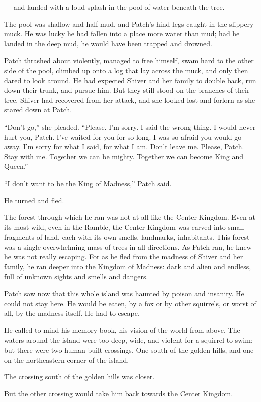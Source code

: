 \documentclass[ebook,oneside,openany,12pt]{memoir}
\begin{document}
— and landed with a loud splash in the pool of water beneath the tree.

The pool was shallow and half-mud, and Patch’s hind legs caught in the
slippery muck. He was lucky he had fallen into a place more water than
mud; had he landed in the deep mud, he would have been trapped and
drowned.

Patch thrashed about violently, managed to free himself, swam hard to
the other side of the pool, climbed up onto a log that lay across the
muck, and only then dared to look around. He had expected Shiver and
her family to double back, run down their trunk, and pursue him. But
they still stood on the branches of their tree. Shiver had recovered
from her attack, and she looked lost and forlorn as she stared down at
Patch.

“Don’t go,” she pleaded. “Please. I’m sorry. I said the wrong thing. I
would never hurt you, Patch. I’ve waited for you for so long. I was so
afraid you would go away. I’m sorry for what I said, for what I
am. Don’t leave me. Please, Patch. Stay with me. Together we can be
mighty. Together we can become King and Queen.”

“I don’t want to be the King of Madness,” Patch said.

He turned and fled.

The forest through which he ran was not at all like the Center
Kingdom. Even at its most wild, even in the Ramble, the Center Kingdom
was carved into small fragments of land, each with its own smells,
landmarks, inhabitants. This forest was a single overwhelming mass of
trees in all directions. As Patch ran, he knew he was not really
escaping. For as he fled from the madness of Shiver and her family, he
ran deeper into the Kingdom of Madness: dark and alien and endless,
full of unknown sights and smells and dangers.

Patch saw now that this whole island was haunted by poison and
insanity. He could not stay here. He would be eaten, by a fox or by
other squirrels, or worst of all, by the madness itself. He had to
escape.

He called to mind his memory book, his vision of the world from
above. The waters around the island were too deep, wide, and violent
for a squirrel to swim; but there were two human-built crossings. One
south of the golden hills, and one on the northeastern corner of the
island.

The crossing south of the golden hills was closer.

But the other crossing would take him back towards the Center Kingdom.
\end{document}
